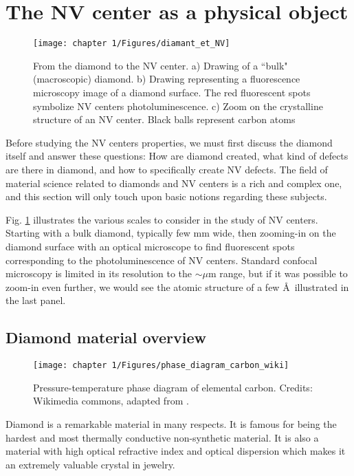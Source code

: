 \documentclass[a4paper, 11pt]{report}
\begin{document}
\section{The NV center as a physical object}
\begin{figure}[h!]
\centering
\texttt{[image: chapter 1/Figures/diamant\_et\_NV]}
\caption{From the diamond to the NV center. a) Drawing of a ``bulk" (macroscopic) diamond. b) Drawing representing a fluorescence microscopy image of a diamond surface. The red fluorescent spots symbolize NV centers photoluminescence. c) Zoom on the crystalline structure of an NV center. Black balls represent carbon atoms}
\label{diamond+NV}
\end{figure}
Before studying the NV centers properties, we must first discuss the diamond itself and answer these questions: How are diamond created, what kind of defects are there in diamond, and how to specifically create NV defects. The field of material science related to diamonds and NV centers is a rich and complex one, and this section will only touch upon basic notions regarding these subjects.

Fig. \ref{diamond+NV} illustrates the various scales to consider in the study of NV centers. Starting with a bulk diamond, typically few mm wide, then zooming-in on the diamond surface with an optical microscope to find fluorescent spots corresponding to the photoluminescence of NV centers. Standard confocal microscopy is limited in its resolution to the $\sim \mu$m range, but if it was possible to zoom-in even further, we would see the atomic structure of a few \AA \ illustrated in the last panel. 
\subsection{Diamond material overview}
\begin{figure}[h!]
\centering
\texttt{[image: chapter 1/Figures/phase\_diagram\_carbon\_wiki]}
\caption{Pressure-temperature phase diagram of elemental carbon. Credits: Wikimedia commons, adapted from \citep{bundy1989pressure, bundy1996pressure}.}
\label{carbon phase diagram}
\end{figure}

Diamond is a remarkable material in many respects. It is famous for being the hardest and most thermally conductive non-synthetic material. It is also a material with high optical refractive index and optical dispersion which makes it an extremely valuable crystal in jewelry.
\end{document}
